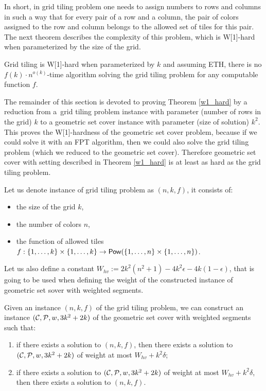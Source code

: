 In short, in grid tiling problem one needs to assign numbers
to rows and columns in such a way
that for every pair of a row and a column,
the pair of colors assigned
to the row and column 
belongs to the allowed set of tiles for this pair.
The next theorem describes the complexity of this problem,
which is W[1]-hard when parameterized by the size of the grid.



\begin{tw}
\label{grid_tiling_w1_hard}
\textbf{\cite{marx_grid_tiling}}
Grid tiling is W[1]-hard when parameterized by $k$ and
assuming ETH, there is no $f(k)\cdot n^{o(k)}$-time
algorithm solving the grid tiling problem
for any computable function $f$.
\end{tw}

The remainder of this section is devoted to proving Theorem \ref{w1_hard}
by a reduction from a~grid tiling problem instance
with parameter (number of rows in the grid) $k$
to a geometric set cover instance with parameter (size of solution) $k^2$.
This proves the W[1]-hardness of the geometric set cover problem,
because if we could solve it with an FPT algorithm,
then we could also solve the grid tiling problem
(which we reduced to the geometric set cover).
Therefore geometric set cover with setting
described in Theorem \ref{w1_hard}
is at least as hard as the grid tiling problem.

Let us denote instance of grid tiling problem as $(n, k, f)$, it consists of:
\begin{itemize}
\item the size of the grid $k$,
\item the number of colors $n$,
\item the function of allowed tiles
$f : \{1, \ldots, k\} \times \{1, \ldots, k\} \rightarrow \mathsf{Pow}(\{1, \ldots, n\} \times \{1, \ldots, n\})$.
\end{itemize}

Let us also define a constant $W_{hv} := 2k^2(n^2+1) -4k^2\epsilon -4k(1-\epsilon)$,
that is going to be used when defining the weight of the constructed
instance of geometric set sover with weighted segments.

\newcommand{\solWeight}{W_{hv} +k^2\delta }
\newcommand{\instanceSetCover}{(\points, \sets, w, 3k^2+2k)}

\begin{lemma}
\label{w1_construction}
Given an instance $(n,k,f)$ of the grid tiling problem,
we can construct an instance $\instanceSetCover$ of the geometric set cover
with weighted segments such that:
\begin{enumerate}[label={(\arabic*)}]
\item if there exists a solution to $(n,k,f)$, then there exists a solution
to $\instanceSetCover$ of weight at most $\solWeight$;
\item if there exists a solution to $\instanceSetCover$ of weight at most $\solWeight$,
then there exists a solution to $(n,k,f)$.
\end{enumerate}
\end{lemma}


